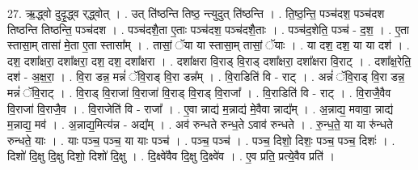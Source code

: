 \documentclass[17pt]{extarticle}
\begin{document}
27. ऋ॒द्ध्वो दुदृ॒द्ध्व र्‌द्ध्वोत् । . उत् ति॑ष्ठन्ति तिष्ठ॒ न्त्युदुत् ति॑ष्ठन्ति । . ति॒ष्ठ॒न्ति॒ पञ्च॑दश॒ पञ्च॑दश तिष्ठन्ति तिष्ठन्ति॒ पञ्च॑दश । . पञ्च॑दशै॒ता ए॒ताः पञ्च॑दश॒ पञ्च॑दशै॒ताः । . पञ्च॑द॒शेति॒ पञ्च॑ - द॒श॒ । . ए॒ता स्तासा॒म् तासा॑ मे॒ता ए॒ता स्तासा᳚म् । . तासां॒ ॅया या स्तासा॒म् तासां॒ ॅयाः । . या दश॒ दश॒ या या दश॑ । . दश॒ दशा᳚क्षरा॒ दशा᳚क्षरा॒ दश॒ दश॒ दशा᳚क्षरा । . दशा᳚क्षरा वि॒राड् वि॒राड् दशा᳚क्षरा॒ दशा᳚क्षरा वि॒राट् । . दशा᳚क्ष॒रेति॒ दश॑ - अ॒क्ष॒रा॒ । . वि॒रा डन्न॒ मन्नं॑ ॅवि॒राड् वि॒रा डन्न᳚म् । . वि॒राडिति॑ वि - राट् । . अन्नं॑ ॅवि॒राड् वि॒रा डन्न॒ मन्नं॑ ॅवि॒राट् । . वि॒राड् वि॒राजा॑ वि॒राजा॑ वि॒राड् वि॒राड् वि॒राजा᳚ । . वि॒राडिति॑ वि - राट् । . वि॒राजै॒वैव वि॒राजा॑ वि॒राजै॒व । . वि॒राजेति॑ वि - राजा᳚ । . ए॒वा न्नाद्य॑ म॒न्नाद्य॑ मे॒वैवा न्नाद्य᳚म् । . अ॒न्नाद्य॒ मवावा॒ न्नाद्य॑ म॒न्नाद्य॒ मव॑ । . अ॒न्नाद्य॒मित्य॑न्न - अद्य᳚म् । . अव॑ रुन्धते रुन्ध॒ते ऽवाव॑ रुन्धते । . रु॒न्ध॒ते॒ या या रु॑न्धते रुन्धते॒ याः । . याः पञ्च॒ पञ्च॒ या याः पञ्च॑ । . पञ्च॒ पञ्च॑ । . पञ्च॒ दिशो॒ दिशः॒ पञ्च॒ पञ्च॒ दिशः॑ । . दिशो॑ दि॒क्षु दि॒क्षु दिशो॒ दिशो॑ दि॒क्षु । . दि॒क्ष्वे॑वैव दि॒क्षु दि॒क्ष्वे॑व । . ए॒व प्रति॒ प्रत्ये॒वैव प्रति॑ । \newline
\end{document}

